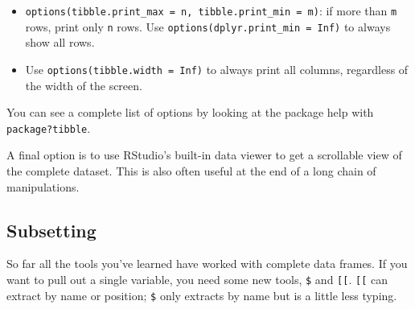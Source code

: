 \documentclass[]{book}
\newenvironment{Shaded}{\begin{snugshade}}{\end{snugshade}}
\newcommand{\KeywordTok}[1]{\textcolor[rgb]{0.13,0.29,0.53}{\textbf{{#1}}}}
\newcommand{\DataTypeTok}[1]{\textcolor[rgb]{0.13,0.29,0.53}{{#1}}}
\newcommand{\DecValTok}[1]{\textcolor[rgb]{0.00,0.00,0.81}{{#1}}}
\newcommand{\StringTok}[1]{\textcolor[rgb]{0.31,0.60,0.02}{{#1}}}
\newcommand{\CommentTok}[1]{\textcolor[rgb]{0.56,0.35,0.01}{\textit{{#1}}}}
\newcommand{\NormalTok}[1]{{#1}}
\begin{document}
\begin{itemize}
\item
  \texttt{options(tibble.print\_max\ =\ n,\ tibble.print\_min\ =\ m)}:
  if more than \texttt{m} rows, print only \texttt{n} rows. Use
  \texttt{options(dplyr.print\_min\ =\ Inf)} to always show all rows.
\item
  Use \texttt{options(tibble.width\ =\ Inf)} to always print all
  columns, regardless of the width of the screen.
\end{itemize}

You can see a complete list of options by looking at the package help
with \texttt{package?tibble}.

A final option is to use RStudio's built-in data viewer to get a
scrollable view of the complete dataset. This is also often useful at
the end of a long chain of manipulations.

\begin{Shaded}
\end{Shaded}

\subsection{Subsetting}\label{subsetting}

So far all the tools you've learned have worked with complete data
frames. If you want to pull out a single variable, you need some new
tools, \texttt{\$} and \texttt{{[}{[}}. \texttt{{[}{[}} can extract by
name or position; \texttt{\$} only extracts by name but is a little less
typing.

\begin{Shaded}
\end{Shaded}
\end{document}
